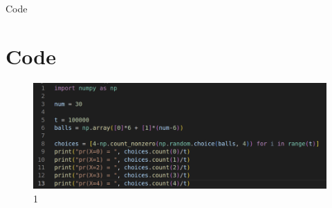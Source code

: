 \documentclass{beamer}
\begin{document}
    \begin{frame}{Code}
        \section{Code}
        \begin{figure}
            \includegraphics[width=\textwidth]{images/PythonCode.png}
            \caption{1}
            \label{Fig:code}
        \end{figure}
    \end{frame}
\end{document}
